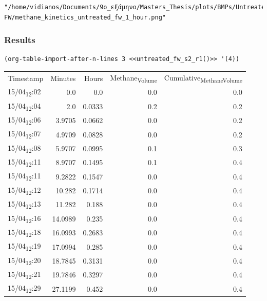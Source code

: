 \documentclass[11pt]{article}
\begin{document}
\begin{verbatim}
"/home/vidianos/Documents/9o_εξάμηνο/Masters_Thesis/plots/BMPs/Untreated FW/methane_kinetics_untreated_fw_1_hour.png"
\end{verbatim}

\subsubsection{Results}
\label{sec:org2499221}

\begin{verbatim}
(org-table-import-after-n-lines 3 <<untreated_fw_s2_r1()>> '(4))
\end{verbatim}

\begin{center}
\begin{tabular}{lrrrr}
Timestamp & Minutes & Hours & Methane\textsubscript{Volume} & Cumulative\textsubscript{Methane}\textsubscript{Volume}\\[0pt]
15/04\textsubscript{12}:02 & 0.0 & 0.0 & 0.0 & 0.0\\[0pt]
15/04\textsubscript{12}:04 & 2.0 & 0.0333 & 0.2 & 0.2\\[0pt]
15/04\textsubscript{12}:06 & 3.9705 & 0.0662 & 0.0 & 0.2\\[0pt]
15/04\textsubscript{12}:07 & 4.9709 & 0.0828 & 0.0 & 0.2\\[0pt]
15/04\textsubscript{12}:08 & 5.9707 & 0.0995 & 0.1 & 0.3\\[0pt]
15/04\textsubscript{12}:11 & 8.9707 & 0.1495 & 0.1 & 0.4\\[0pt]
15/04\textsubscript{12}:11 & 9.2822 & 0.1547 & 0.0 & 0.4\\[0pt]
15/04\textsubscript{12}:12 & 10.282 & 0.1714 & 0.0 & 0.4\\[0pt]
15/04\textsubscript{12}:13 & 11.282 & 0.188 & 0.0 & 0.4\\[0pt]
15/04\textsubscript{12}:16 & 14.0989 & 0.235 & 0.0 & 0.4\\[0pt]
15/04\textsubscript{12}:18 & 16.0993 & 0.2683 & 0.0 & 0.4\\[0pt]
15/04\textsubscript{12}:19 & 17.0994 & 0.285 & 0.0 & 0.4\\[0pt]
15/04\textsubscript{12}:20 & 18.7845 & 0.3131 & 0.0 & 0.4\\[0pt]
15/04\textsubscript{12}:21 & 19.7846 & 0.3297 & 0.0 & 0.4\\[0pt]
15/04\textsubscript{12}:29 & 27.1199 & 0.452 & 0.0 & 0.4\\[0pt]

\end{tabular}
\end{center}
\end{document}
